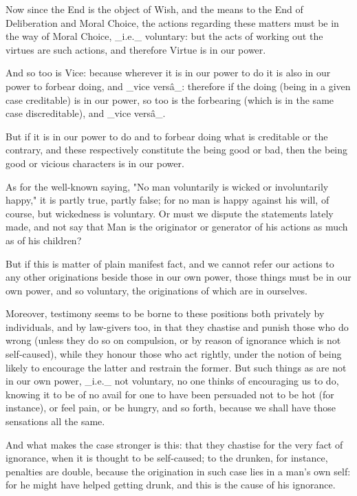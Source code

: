 Now since the End is the object of Wish, and the means to the End of
Deliberation and Moral Choice, the actions regarding these matters
must be in the way of Moral Choice, _i.e._ voluntary: but the acts of
working out the virtues are such actions, and therefore Virtue is in our
power.

And so too is Vice: because wherever it is in our power to do it is also
in our power to forbear doing, and _vice versâ_: therefore if the doing
(being in a given case creditable) is in our power, so too is the
forbearing (which is in the same case discreditable), and _vice versâ_.

But if it is in our power to do and to forbear doing what is creditable
or the contrary, and these respectively constitute the being good or
bad, then the being good or vicious characters is in our power.

As for the well-known saying, "No man voluntarily is wicked or
involuntarily happy," it is partly true, partly false; for no man is
happy against his will, of course, but wickedness is voluntary. Or must
we dispute the statements lately made, and not say that Man is the
originator or generator of his actions as much as of his children?

But if this is matter of plain manifest fact, and we cannot refer our
actions to any other originations beside those in our own power, those
things must be in our own power, and so voluntary, the originations of
which are in ourselves.

Moreover, testimony seems to be borne to these positions both privately
by individuals, and by law-givers too, in that they chastise and punish
those who do wrong (unless they do so on compulsion, or by reason of
ignorance which is not self-caused), while they honour those who act
rightly, under the notion of being likely to encourage the latter and
restrain the former. But such things as are not in our own power, _i.e._
not voluntary, no one thinks of encouraging us to do, knowing it to be
of no avail for one to have been persuaded not to be hot (for instance),
or feel pain, or be hungry, and so forth, because we shall have those
sensations all the same.

And what makes the case stronger is this: that they chastise for the
very fact of ignorance, when it is thought to be self-caused; to the
drunken, for instance, penalties are double, because the origination in
such case lies in a man's own self: for he might have helped getting
drunk, and this is the cause of his ignorance.

